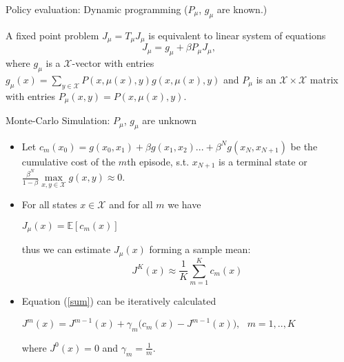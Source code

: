 \documentclass{beamer}
\def\X{{\mathcal X}}
\def\E{{\mathbb E}}
\begin{document}
\begin{frame}{Policy evaluation: Dynamic programming ($P_\mu$, $g_{\mu}$ are known.)}


   
  A fixed point problem $J_\mu = T_\mu J_\mu$ is equivalent to linear system of equations 
     \begin{equation*}
  J_\mu = g_\mu +\beta P_\mu J_\mu,
    \end{equation*}
where $g_\mu$ is a $\X$-vector with entries $g_\mu(x) = \sum\limits_{y\in \X}P(x, \mu(x), y)g(x,  \mu(x), y)$ and
 $P_\mu$ is an $\X \times\X$
matrix with entries $P_\mu(x, y) = P(x, \mu(x), y)$.

\end{frame}

\begin{frame}{Monte-Carlo Simulation: $P_\mu$, $g_{\mu}$ are unknown }
\begin{itemize}

  \item Let $c_m(x_0) = g(x_0, x_1)+\beta g(x_1, x_2)...+\beta^{N}g(x_{N}, x_{N+1})$
   be the cumulative cost of the $m$th episode, s.t. $x_{N+1}$ is a terminal state or $\frac{\beta^N}{1-\beta} \max\limits_{x,y\in \X} g(x, y)\approx 0.$  
  \item For all states $x\in \X$ and for all $m$ we have
  \begin{center}
  $
  J_\mu(x) = \E[c_m(x)]
  $
  \end{center}
  thus we can estimate $J_\mu(x)$ forming a sample mean:
  \begin{equation}\label{sum}
  J^K(x) \approx \frac{1}{K} \sum\limits_{m=1}^K c_m(x)
  \end{equation}
  
  \item Equation (\ref{sum}) can be iteratively calculated
  
   \begin{center}
   $J^{m}(x) = J^{m-1}(x)+\gamma_m\Big(c_m(x) - J^{m-1}(x)\Big),~~~m=1,..,K$ 
   \end{center}
   
    where $J^0(x) = 0$ and $\gamma_m = \frac{1}{m}.$
\end{itemize}
  
  
  
 





\end{frame}
\end{document}
